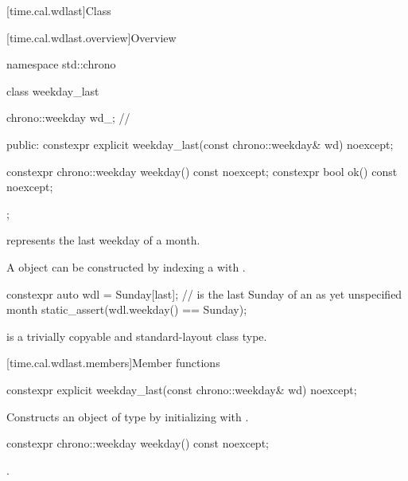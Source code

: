 [time.cal.wdlast]{Class }

[time.cal.wdlast.overview]{Overview}

\begin{codeblock}
namespace std::chrono {
  class weekday_last {
    chrono::weekday wd_;                // \expos

    public:
    constexpr explicit weekday_last(const chrono::weekday& wd) noexcept;

    constexpr chrono::weekday weekday() const noexcept;
    constexpr bool ok() const noexcept;
  };
}
\end{codeblock}

\pnum
{} represents the last weekday of a month.

\pnum
\begin{note}
A  object
can be constructed by indexing a  with .
\end{note}
\begin{example}
\begin{codeblock}
constexpr auto wdl = Sunday[last];      //  is the last Sunday of an as yet unspecified month
static_assert(wdl.weekday() == Sunday);
\end{codeblock}
\end{example}

\pnum
{} is a trivially copyable and standard-layout class type.

[time.cal.wdlast.members]{Member functions}

%
\begin{itemdecl}
constexpr explicit weekday_last(const chrono::weekday& wd) noexcept;
\end{itemdecl}

\begin{itemdescr}
\pnum
\effects
Constructs an object of type  by
initializing  with .
\end{itemdescr}

%
\begin{itemdecl}
constexpr chrono::weekday weekday() const noexcept;
\end{itemdecl}

\begin{itemdescr}
\pnum
\returns
{}.
\end{itemdescr}

